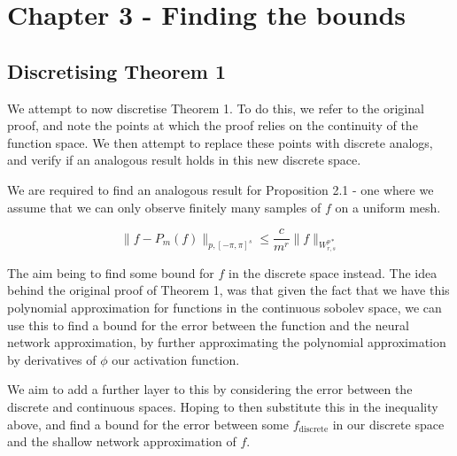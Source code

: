 \documentclass[11pt,a4paper]{article}
\theoremstyle{plain}
\theoremstyle{definition}
\theoremstyle{remark}
\begin{document}

\setcounter{section}{2} 
\section{Chapter 3 - Finding the bounds}

\subsection{Discretising Theorem 1}

We attempt to now discretise Theorem 1. To do this, we refer to the original proof, and note the points at which the proof relies on the continuity of the function space. We then attempt to replace these points with discrete analogs, and verify if an analogous result holds in this new discrete space.

We are required to find an analogous result for Proposition 2.1 - one where we assume that we can only observe finitely many samples of \(f\) on a uniform mesh.

\[
    \|f - P_{m}(f)\|_{p,[-\pi,\pi]^s} \leq \frac{c}{m^r} \|f\|_{W^{p*}_{r,s}} 
\]

The aim being to find some bound for \(f\) in the discrete space instead. The idea behind the original proof of Theorem 1, was that given the fact that we have this polynomial approximation for functions in the continuous sobolev space, we can use this to find a bound for the error between the function and the neural network approximation, by further approximating the polynomial approximation by derivatives of \(\phi \) our activation function.

We aim to add a further layer to this by considering the error between the discrete and continuous spaces. Hoping to then substitute this in the inequality above, and find a bound for the error between some \(f_{\text{discrete} }\) in our discrete space and the shallow network approximation of \(f\).
\end{document}
